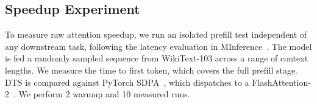 \subsection{Speedup Experiment}

To measure raw attention speedup, we run an isolated prefill test independent of any downstream task, following the latency evaluation in MInference~\cite{jiang2024minference}. The model is fed a randomly sampled sequence from WikiText-103 across a range of context lengths. We measure the time to first token, which covers the full prefill stage. DTS is compared against PyTorch SDPA~\cite{paszke2019pytorch, vaswani2017attention}, which dispatches to a FlashAttention-2~\cite{dao2023flashattention2}. We perform 2 warmup and 10 measured runs. 
